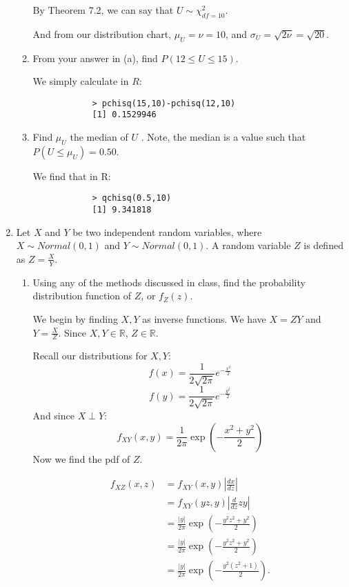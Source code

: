 \documentclass{article}
\begin{document}
\begin{enumerate}
\begin{enumerate}[label= (\alph*)]
        By Theorem 7.2, we can say that $U\sim\chi^2_{df=10}$.

        And from our distribution chart, $\mu_U=\nu=10$, and $\sigma_U=\sqrt{ 2\nu}=\sqrt{ 20}$.

    \item From your answer in (a), find $P (12 \leq U \leq 15)$.

        We simply calculate in $R$:

        \begin{verbatim}
            > pchisq(15,10)-pchisq(12,10)
            [1] 0.1529946
        \end{verbatim}

    \item Find $\mu_U$  the median of $U$ . Note, the median is a value such that 
        $P (U \leq\mu_U ) = 0.50$.

        We find that in R: 
        \begin{verbatim}
            > qchisq(0.5,10)
            [1] 9.341818
        \end{verbatim}
\end{enumerate}

\item Let $X$ and $Y$ be two independent random variables, where 
    $X \sim \textit{Normal}(0,1)$ and $Y \sim \textit{Normal}(0,1)$. 
    A random variable $Z$ is defined as $Z = \frac{X}{Y}$.

\begin{enumerate}[label= (\alph*)] 
\item Using any of the methods discussed in class, find the probability distribution function of $Z$,
    or $f_Z (z)$.

    We begin by finding $X,Y$ as inverse functions. We have $X=ZY$ and $Y=\frac{X}{Z}$. 
    Since $X,Y\in \mathbb{R}$, $Z\in \mathbb{R}$.

    Recall our distributions for $X,Y$:
    \[
    f(x)=\frac{1}{2\sqrt{2\pi} }e^{-\frac{x^2}{2}}
    \] 
    \[
    f(y)=\frac{1}{2\sqrt{2\pi} }e^{-\frac{y^2}{2}}
    \] 
    And since $X\perp Y$:
    \[
    f_{XY}(x,y)=\frac{1}{2\pi}\exp\left( -\frac{x^2+y^2}{2} \right) 
    \] 
    Now we find the pdf of $Z$.

    \begin{align*}
        f_{XZ}(x,z)&= f_{XY}(x,y)\left| \frac{dx}{dz} \right|  \\
        &= f_{XY}(yz,y)\left| \frac{d}{dz}zy \right|  \\
        &= \frac{|y|}{2\pi}\exp\left( -\frac{y^2z^2+y^2}{2} \right)  \\
        &= \frac{|y|}{2\pi} \exp\left( -\frac{y^2z^2+y^2}{2} \right)\\
        &= \frac{|y|}{2\pi} \exp\left( -\frac{y^2(z^2+1)}{2} \right)
    .\end{align*}


\end{enumerate}
\end{enumerate}
\end{document}
